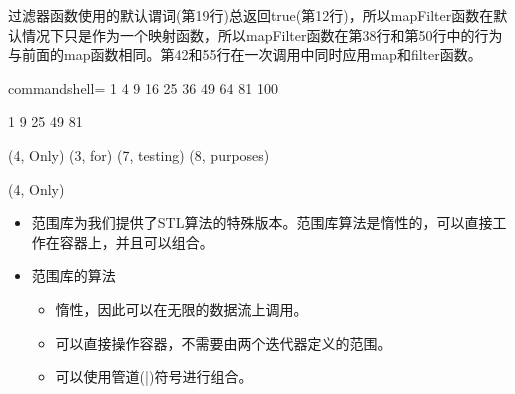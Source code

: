 过滤器函数使用的默认谓词(第19行)总返回true(第12行)，所以mapFilter函数在默认情况下只是作为一个映射函数，所以mapFilter函数在第38行和第50行中的行为与前面的map函数相同。第42和55行在一次调用中同时应用map和filter函数。

\begin{tcblisting}{commandshell={}}
1 4 9 16 25 36 49 64 81 100

1 9 25 49 81

(4, Only) (3, for) (7, testing) (8, purposes)

(4, Only)
\end{tcblisting}

\begin{tcolorbox}[breakable,enhanced jigsaw,colback=mygreen!5!white,colframe=mygreen!75!black,title={总结}]
\begin{itemize}
\item 
范围库为我们提供了STL算法的特殊版本。范围库算法是惰性的，可以直接工作在容器上，并且可以组合。

\item 
范围库的算法
\begin{itemize}
\item 
惰性，因此可以在无限的数据流上调用。

\item 
可以直接操作容器，不需要由两个迭代器定义的范围。

\item 
可以使用管道(|)符号进行组合。
\end{itemize}
\end{itemize}
\end{tcolorbox}	
	
\newpage
	
	
	
	
	
	
	
	
	
	
	
	
	
	
	
	
	
	
	
	
	